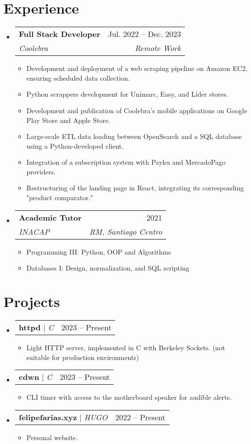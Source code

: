 \documentclass[letterpaper,11pt]{article}
\makeatletter
\newcommand{\resumeItem}[1]{
  \item\small{
    {#1 \vspace{-2pt}}
  }
}
\newcommand{\resumeSubheading}[4]{
  \vspace{-2pt}\item
    \begin{tabular*}{0.97\textwidth}[t]{l@{\extracolsep{\fill}}r}
      \textbf{#1} & #2 \\
      \textit{\small#3} & \textit{\small #4} \\
    \end{tabular*}\vspace{-7pt}
}
\newcommand{\resumeProjectHeading}[2]{
    \item
    \begin{tabular*}{0.97\textwidth}{l@{\extracolsep{\fill}}r}
      \small#1 & #2 \\
    \end{tabular*}\vspace{-7pt}
}
\newcommand{\resumeSubHeadingListStart}{\begin{itemize}[leftmargin=0.15in, label={}]}
\newcommand{\resumeSubHeadingListEnd}{\end{itemize}}
\newcommand{\resumeItemListStart}{\begin{itemize}}
\newcommand{\resumeItemListEnd}{\end{itemize}\vspace{-5pt}}
\makeatother
\begin{document}
\section{Experience}
  \resumeSubHeadingListStart

\resumeSubheading
  {Full Stack Developer}{Jul. 2022 -- Dec. 2023}
  {Coolebra}{Remote Work}
  \resumeItemListStart
    \resumeItem{Development and deployment of a web scraping pipeline on Amazon EC2, ensuring scheduled data collection.}
    \resumeItem{Python scrappers development for Unimarc, Easy, and Líder stores.}
    \resumeItem{Development and publication of Coolebra’s mobile applications on Google Play Store and Apple Store.}
    \resumeItem{Large-scale ETL data loading between OpenSearch and a SQL database using a Python-developed client.}
    \resumeItem{Integration of a subscription system with Payku and MercadoPago providers.}
    \resumeItem{Restructuring of the landing page in React, integrating its corresponding "product comparator."}
  \resumeItemListEnd      

\resumeSubheading
  {Academic Tutor}{2021}
  {INACAP}{RM, Santiago Centro}
  \resumeItemListStart
    \resumeItem{Programming III: Python, OOP and Algorithms}
    \resumeItem{Databases I: Design, normalization, and SQL scripting}
  \resumeItemListEnd
  
  \resumeSubHeadingListEnd


\section{Projects}
    \resumeSubHeadingListStart
      \resumeProjectHeading
          {\textbf{httpd} $|$ \emph{C}}{2023 -- Present}
          \resumeItemListStart
            \resumeItem{Light HTTP server, implemented in C with Berkeley Sockets. (not suitable for production environments)}
          \resumeItemListEnd

        \resumeProjectHeading
          {\textbf{cdwn} $|$ \emph{C}}{2023 -- Present}
          \resumeItemListStart
            \resumeItem{CLI timer with access to the motherboard speaker for audible alerts.}
          \resumeItemListEnd

        \resumeProjectHeading
          {\textbf{felipefarias.xyz} $|$ \emph{HUGO}}{2022 -- Present}
          \resumeItemListStart
            \resumeItem{Personal website.}
          \resumeItemListEnd

    \resumeSubHeadingListEnd
\end{document}
